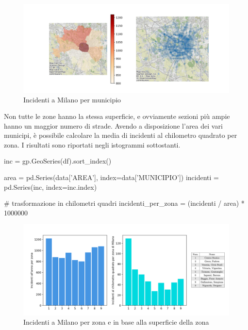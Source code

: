 \documentclass[a4paper,12pt]{report}
\begin{document}
\begin{figure}
    \includegraphics[width=\linewidth]{../src/municipi_milano/incidenti_municipio.png}
    \caption{Incidenti a Milano per municipio}
    \label{fig:heatmap-municipi}
\end{figure}

Non tutte le zone hanno la stessa superficie, e ovviamente sezioni più ampie hanno un maggior 
numero di strade. Avendo a disposizione l'area dei vari municipi, 
è possibile calcolare la media di incidenti al chilometro quadrato per zona. 
I risultati sono riportati negli istogrammi sottostanti. 

\begin{code}    
inc = gp.GeoSeries(df).sort_index()

area = pd.Series(data['AREA'], index=data['MUNICIPIO'])
incidenti = pd.Series(inc, index=inc.index)

# trasformazione in chilometri quadri
incidenti_per_zona = (incidenti / area) * 1000000 
\end{code}

\begin{figure}
    \includegraphics[width=\linewidth]{../src/municipi_milano/incidenti_superf.png}
    \caption{Incidenti a Milano per zona e in base alla superficie della zona}
    \label{fig:incidenti-chilometro}
\end{figure}
\end{document}
